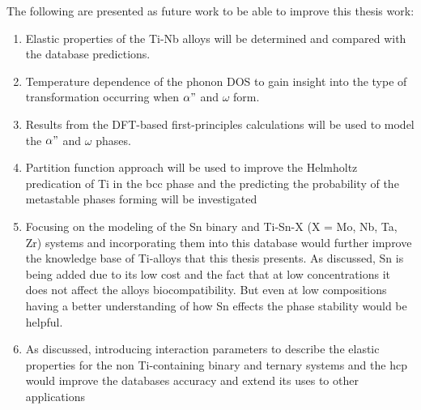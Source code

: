 The following are presented as future work to be able to improve this thesis work:
\begin{enumerate}
	\item Elastic properties of the Ti-Nb alloys will be determined and compared with the database predictions. 
	\item Temperature dependence of the phonon DOS to gain insight into the type of transformation occurring when $\alpha"$ and $\omega$ form.
	\item Results from the DFT-based first-principles calculations will be used to model the $\alpha"$ and $\omega$ phases.
	\item Partition function approach will be used to improve the Helmholtz predication of Ti in the bcc phase and the predicting the probability of the metastable phases forming will be investigated
	\item Focusing on the modeling of the Sn binary and Ti-Sn-X (X = Mo, Nb, Ta, Zr) systems and incorporating them into this database would further improve the knowledge base of Ti-alloys that this thesis presents. As discussed, Sn is being added due to its low cost and the fact that at low concentrations it does not affect the alloys biocompatibility. But even at low compositions having a better understanding of how Sn effects the phase stability would be helpful.
	\item As discussed, introducing interaction parameters to describe the elastic properties for the non Ti-containing binary and ternary systems and the hcp would improve the databases accuracy and extend its uses to other applications
\end{enumerate}